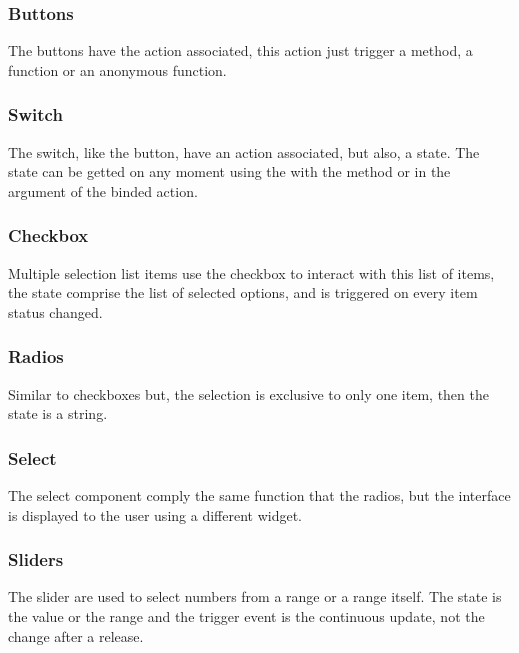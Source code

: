 \subsubsection{Buttons}
The buttons have the action  associated, this action just trigger a method, a function or an anonymous function.


\subsubsection{Switch}
The switch, like the button, have an action associated, but also, a state. The state can be getted on any moment using the  with the method  or in the argument of the binded action.


\subsubsection{Checkbox}
Multiple selection list items use the checkbox to interact with this list of items, the state comprise the list of selected options, and  is triggered on every item status changed.



\subsubsection{Radios}
Similar to checkboxes but, the selection is exclusive to only one item, then the state is a string.


\subsubsection{Select}
The select component comply the same function that the radios, but the interface is displayed to the user using a different widget. 



\subsubsection{Sliders}
The slider are used to select numbers from a range or a range itself. The state is the value or the range and the trigger event is the continuous update, not the change after a release.


